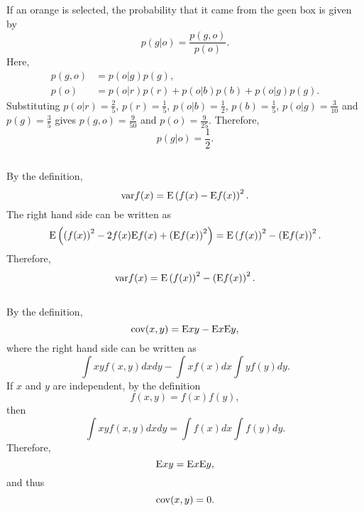 If an orange is selected, the probability that it came from the geen box is given by
%
\begin{equation}
p(g | o) = \frac{p(g, o)}{p(o)}.
\end{equation}
%
Here,
%
\begin{equation}
\begin{aligned}
p(g, o) &= p(o | g) p(g), \\
p(o) & = p(o | r) p(r) + p(o | b) p(b) + p(o | g) p(g).
\end{aligned}
\end{equation}
%
Substituting $p(o | r) = \frac{2}{5}$, $p(r) = \frac{1}{5}$, $p(o | b) = \frac{1}{2}$, $p(b) = \frac{1}{5}$, $p(o | g) = \frac{3}{10}$ and $p(g) = \frac{3}{5}$ gives $p(g, o) = \frac{9}{50}$ and $p(o) = \frac{9}{25}$.
%
Therefore,
\begin{equation}
p(g | o) = \frac{1}{2}.
\end{equation}




\subsection{}
By the definition, 
%
\begin{equation}
{\rm var} f(x) = {\rm E} \left( f(x) - {\rm E} f(x) \right) ^ 2.
\end{equation}
%
The right hand side can be written as 
%
\begin{equation}
{\rm E} \left( \left( f(x) \right) ^ 2 - 2 f(x) {\rm E} f(x) + \left( {\rm E} f(x) \right) ^ 2 \right) = {\rm E} \left( f(x) \right) ^ 2 - \left( {\rm E} f(x) \right) ^ 2.
\end{equation}
%
Therefore, 
%
\begin{equation}
{\rm var} f(x) = {\rm E} \left( f(x) \right) ^ 2 - \left( {\rm E} f(x) \right) ^ 2.
\end{equation}
%


\subsection{}
By the definition,
%
\begin{equation}
{\rm cov} (x, y) = {\rm E} xy - {\rm E} x {\rm E} y,
\end{equation}
%
where the right hand side can be written as
%
\begin{equation}
\int xy f(x, y) dx dy - \int x f(x) dx \int y f(y) dy.
\end{equation}
%
If $x$ and $y$ are independent, by the definition
%
\begin{equation}
f(x, y) = f(x) f(y),
\end{equation}
%
then
%
\begin{equation}
\int xy f(x, y) dx dy = \int f(x) dx \int f(y) dy.
\end{equation}
%
Therefore,
%
\begin{equation}
{\rm E} xy = {\rm E} x {\rm E} y,
\end{equation}
%
and thus
%
\begin{equation}
{\rm cov} (x, y) = 0.
\end{equation}
%


